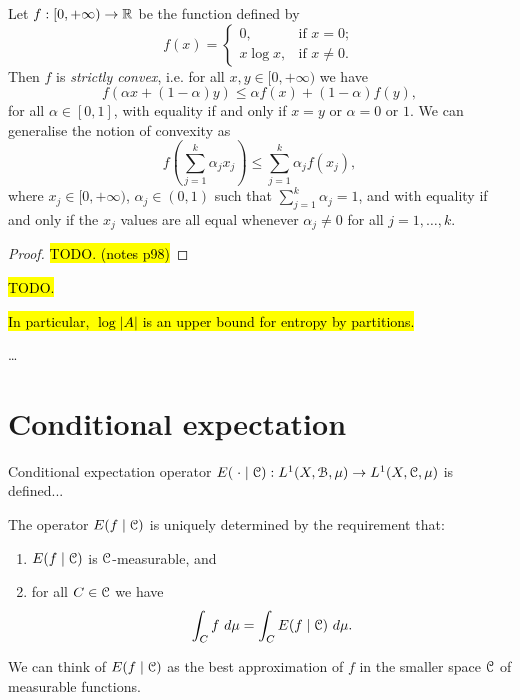 \begin{theorem} \label{thm:walters-4-2-xlogx-convex}
	Let $f : [0, +\infty) \to \mathbb{R}$ be the function defined by
	\[
		f(x) =
		\begin{cases}
			0, & \text{if } x = 0; \\
			x\log{x}, & \text{if } x \neq 0.
		\end{cases}
	\]
	Then $f$ is \emph{strictly convex}, i.e. for all $x, y \in [0, +\infty)$ we have
	\[
		f(\alpha x + (1 - \alpha)y) \leq \alpha f(x) + (1 - \alpha)f(y),
	\]
	for all $\alpha \in [0, 1]$, with equality if and only if $x = y$ or $\alpha = 0$ or $1$. We can generalise the notion of convexity as
	\[
		f\left(\sum_{j = 1}^k{\alpha_j x_j}\right) \leq \sum_{j = 1}^k{\alpha_j} f(x_j),
	\]
	where $x_j \in [0, +\infty)$, $\alpha_j \in (0, 1)$ such that $\sum_{j = 1}^k{\alpha_j} = 1$, and with equality if and only if the $x_j$ values are all equal whenever $\alpha_j \neq 0$ for all $j = 1, \dots, k$.
	\begin{proof}
		\hl{TODO. (notes p98)}
	\end{proof}
\end{theorem}

\begin{corollary} \label{cor:walters-4-2-1}
	\hl{TODO.}
\end{corollary}

\hl{In particular, $\log{|A|}$ is an upper bound for entropy by partitions.}

\dots

\section{Conditional expectation}
\begin{definition}
	Conditional expectation operator $E(\mathrel{}\cdot\mathrel{} \mid \mathcal{C}) : L^1(X, \mathcal{B}, \mu) \to L^1(X, \mathcal{C}, \mu)$ is defined...
\end{definition}

The operator $E(f \mid \mathcal{C})$ is uniquely determined by the requirement that:
\begin{enumerate}
	\item $E(f \mid \mathcal{C})$ is $\mathcal{C}$-measurable, and
	\item for all $C \in \mathcal{C}$ we have
	\[
	\int_C{f\ d\mu} = \int_C{E(f \mid \C)\ d\mu}.
	\]
\end{enumerate}

We can think of $E(f \mid \mathcal{C})$ as the best approximation of $f$ in the smaller space $\mathcal{C}$ of measurable functions.~\cite[Lecture 21]{ergodic-lectures}

